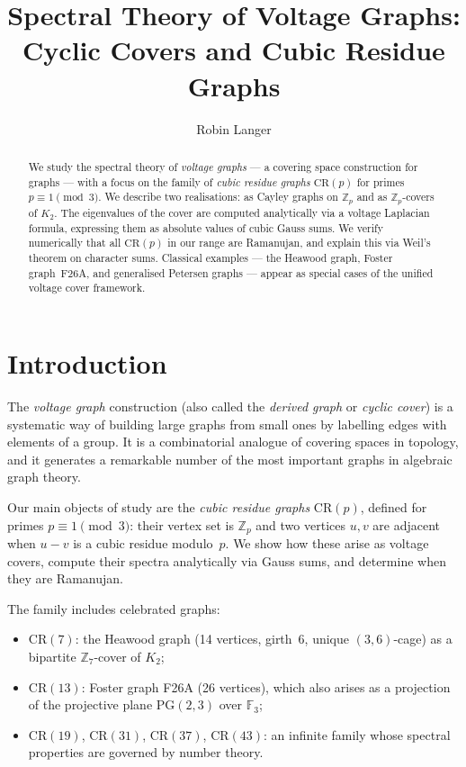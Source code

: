 \documentclass[11pt,a4paper]{article}
\title{Spectral Theory of Voltage Graphs:\\
  Cyclic Covers and Cubic Residue Graphs}
\author{Robin Langer}
\date{}
\theoremstyle{plain}
\theoremstyle{definition}
\theoremstyle{remark}
\newcommand{\Z}{\mathbb{Z}}
\newcommand{\F}{\mathbb{F}}
\newcommand{\CR}{\mathrm{CR}}
\begin{document}
\maketitle

\begin{abstract}
We study the spectral theory of \emph{voltage graphs} --- a covering space
construction for graphs --- with a focus on the family of \emph{cubic residue
graphs} $\CR(p)$ for primes $p \equiv 1 \pmod{3}$. We describe two realisations:
as Cayley graphs on $\Z_p$ and as $\Z_p$-covers of $K_2$. The eigenvalues of
the cover are computed analytically via a voltage Laplacian formula, expressing
them as absolute values of cubic Gauss sums. We verify numerically that all
$\CR(p)$ in our range are Ramanujan, and explain this via Weil's theorem on
character sums. Classical examples --- the Heawood graph, Foster graph~F26A,
and generalised Petersen graphs --- appear as special cases of the unified
voltage cover framework.
\end{abstract}


\section{Introduction}

The \emph{voltage graph} construction (also called the \emph{derived graph}
or \emph{cyclic cover}) is a systematic way of building large graphs from
small ones by labelling edges with elements of a group. It is a combinatorial
analogue of covering spaces in topology, and it generates a remarkable number
of the most important graphs in algebraic graph theory.

Our main objects of study are the \emph{cubic residue graphs} $\CR(p)$, defined
for primes $p \equiv 1 \pmod{3}$: their vertex set is $\Z_p$ and two vertices
$u, v$ are adjacent when $u - v$ is a cubic residue modulo~$p$. We show how
these arise as voltage covers, compute their spectra analytically via Gauss
sums, and determine when they are Ramanujan.

The family includes celebrated graphs:
\begin{itemize}
  \item $\CR(7)$: the Heawood graph (14 vertices, girth~6, unique $(3,6)$-cage)
    as a bipartite $\Z_7$-cover of $K_2$;
  \item $\CR(13)$: Foster graph F26A (26 vertices), which also arises as a
    projection of the projective plane $\mathrm{PG}(2,3)$ over $\F_3$;
  \item $\CR(19)$, $\CR(31)$, $\CR(37)$, $\CR(43)$: an infinite family
    whose spectral properties are governed by number theory.
\end{itemize}
\end{document}

